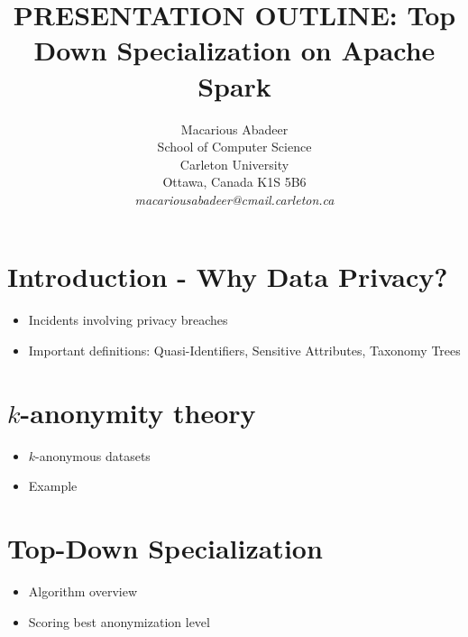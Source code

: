 \documentclass[11pt]{article}       %
\newenvironment{slide}[1]        {\section{#1} \begin{itemize}}%
                                 {\end{itemize}}
\begin{document}


\title{PRESENTATION OUTLINE: Top Down Specialization on Apache Spark\texttrademark}


\author{
Macarious Abadeer\\
School of Computer Science\\
Carleton University\\
Ottawa, Canada K1S 5B6\\
{\em macariousabadeer@cmail.carleton.ca}
} %

\maketitle

\begin{slide}{Introduction - Why Data Privacy?}
\item Incidents involving privacy breaches
\item Important definitions: Quasi-Identifiers, Sensitive Attributes, Taxonomy Trees
\end{slide}

\begin{slide}{$k$-anonymity theory}
\item $k$-anonymous datasets
\item Example
\end{slide}

\begin{slide}{Top-Down Specialization}
\item Algorithm overview
\item Scoring best anonymization level
\end{slide}
\end{document}

